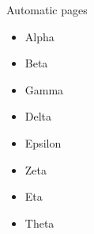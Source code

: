 \documentclass[aspectratio=169]{beamer}
\begin{document}
\begin{frame}[allowframebreaks=1]{Automatic pages}
\begin{itemize}
\item \rule{0pt}{30pt}Alpha
\item \rule{0pt}{30pt}Beta
\item \rule{0pt}{30pt}Gamma
\item \rule{0pt}{30pt}Delta
\item \rule{0pt}{30pt}Epsilon
\item \rule{0pt}{30pt}Zeta
\item \rule{0pt}{30pt}Eta
\item \rule{0pt}{30pt}Theta
\end{itemize}
\end{frame}
\end{document}
